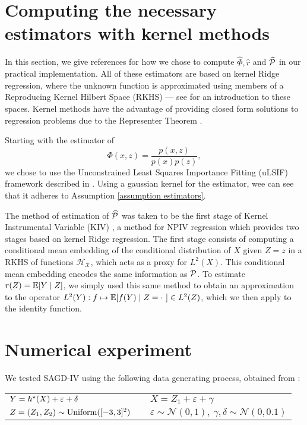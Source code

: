 \section{Computing the necessary estimators with kernel methods}
\label{sec: kernel methods}

In this section, we give references for how we chose to compute $ \hat{ \Phi }, \hat{ r } $ and $ \widehat{ \mathcal{P} } $ in our practical implementation.
All of these estimators are based on kernel Ridge regression, where the unknown function is approximated using members of a Reproducing Kernel Hilbert Space (RKHS) --- see \cite[Chapter~4]{svm2008} for an introduction to these spaces. 
Kernel methods have the advantage of providing closed form solutions to regression problems due to the Representer Theorem \cite[Theorem~1]{representer2001}.

Starting with the estimator of
\begin{equation*}
    \Phi ( x, z ) = \frac{ p ( x, z ) }{ p ( x ) p ( z ) }
,\end{equation*}
we chose to use the Unconstrained Least Squares Importance Fitting (uLSIF) framework described in \cite[Chapter~6]{sugiyama2012}.
Using a gaussian kernel for the estimator, wee can see that it adheres to Assumption \ref{assumption estimators}.

The method of estimation of $ \widehat{ \mathcal{P} } $ was taken to be the first stage of Kernel Instrumental Variable (KIV) \cite{singh2019}, a method for NPIV regression which provides two stages based on kernel Ridge regression.
The first stage consists of computing a conditional mean embedding \cite{cme2009} of the conditional distribution of $ X $ given $ Z = z $ in a RKHS of functions $ \mathcal{H}_{ \mathcal{X} } $, which acts as a proxy for $ L^2 ( X ) $.
This conditional mean embedding encodes the same information as $ \mathcal{P} $.
To estimate $ r ( Z ) = \mathbb{E} [ Y \mid Z ] $, we simply used this same method to obtain an approximation to the operator $ L^2 ( Y ) : f \mapsto \mathbb{E} [ f ( Y ) \mid Z = \cdot \ ] \in L^2 ( Z ) $, which we then apply to the identity function.

\section{Numerical experiment}

We tested SAGD-IV using the following data generating process, obtained from \cite{deepgmm2019}:

\begin{tabular}{lcl}
    $ Y = h^{ \star } ( X ) + \varepsilon + \delta $ & &
    $ X = Z_{ 1 } + \varepsilon + \gamma $ \\
    $ Z = ( Z_{ 1 }, Z_{ 2 } ) \sim \operatorname{Uniform} ( [-3, 3]^2 ) $ & &
    $ \varepsilon \sim \mathcal{N} ( 0, 1 ), \ \gamma, \delta \sim \mathcal{N} ( 0, 0.1 ) $
\end{tabular}

